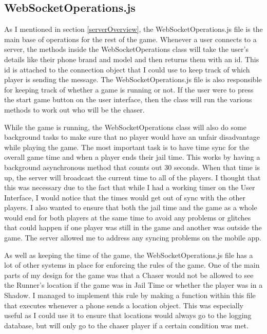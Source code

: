 \documentclass{l4proj}
\begin{document}
\subsection{WebSocketOperations.js}
As I mentioned in section \ref{serverOverview}, the WebSocketOperations.js file is the main base of operations for
the rest of the game. Whenever a user connects to a server, the methods inside the WebSocketOperations class will take
the user's details like their phone brand and model and then returns them with an id. This id is attached to the connection
object that I could use to keep track of which player is sending the message. The WebSocketOperations.js file is also
responsible for keeping track of whether a game is running or not. If the user were to press the start game button on the
user interface, then the class will run the various methods to work out who will be the chaser.

While the game is running, the WebSocketOperations class will also do some background tasks to make sure that no
player would have an unfair disadvantage while playing the game. The most important task is to have time sync for
the overall game time and when a player ends their jail time. This works by having a background asynchronous method
that counts out 30 seconds. When that time is up, the server will broadcast the current time to all of the players.
I thought that this was necessary due to the fact that while I had a working timer on the User Interface, I would
notice that the times would get out of sync with the other players. I also wanted to ensure that both the jail time
and the game as a whole would end for both players at the same time to avoid any problems or glitches that could happen
if one player was still in the game and another was outside the game. The server allowed me to address any syncing
problems on the mobile app.

As well as keeping the time of the game, the WebSocketOperations.js file has a lot of other systems in place for enforcing the
rules of the game. One of the main parts of my design for the game was that a Chaser would not be allowed to see the Runner's
location if the game was in Jail Time or whether the player was in a Shadow. I managed to implement this rule by making
a function within this file that executes whenever a phone sends a location object. This was especially useful as I could
use it to ensure that locations would always go to the logging database, but will only go to the chaser player if a certain
condition was met.
\end{document}
